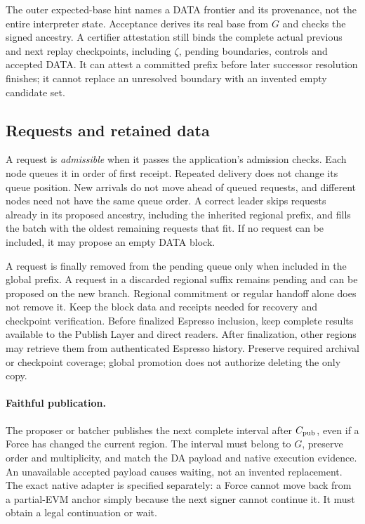\documentclass[11pt,a4paper]{article}
\newcommand{\defterm}[1]{\textcolor{rrBlue}{\textit{#1}}}
\begin{document}
The outer expected-base hint names a DATA frontier and its provenance,
not the entire interpreter state. Acceptance derives its real base from
$G$ and checks the signed ancestry. A certifier attestation still binds
the complete actual previous and next replay checkpoints, including
$\zeta$, pending boundaries, controls and accepted DATA. It can attest a
committed prefix before later successor resolution finishes; it cannot
replace an unresolved boundary with an invented empty candidate set.

\subsection{Requests and retained data}
\label{sec:requests}
A request is \defterm{admissible} when it passes the application's admission
checks. Each node queues it in order of first receipt. Repeated delivery
does not change its queue position. New arrivals do not move
ahead of queued requests, and different nodes need not have the same
queue order. A correct leader skips requests
already in its proposed ancestry, including the inherited regional
prefix, and fills the batch with the oldest remaining requests that fit.
If no request can be included, it may propose an empty DATA block.

A request is finally removed from the pending queue only when included
in the global prefix. A request in a discarded regional suffix remains
pending and can be proposed on the new branch. Regional commitment or
regular handoff alone does not remove it. Keep the block data and
receipts needed for recovery and checkpoint verification. Before finalized Espresso
inclusion, keep complete results available to the Publish Layer and
direct readers. After finalization, other regions may retrieve them from
authenticated Espresso history. Preserve required archival or checkpoint
coverage; global promotion does not authorize deleting the only copy.



\paragraph{Faithful publication.}
The proposer or batcher publishes the next complete interval after
$C_{\rm pub}$, even if a Force has changed the current region.
The interval must belong to $G$, preserve order and multiplicity, and
match the DA payload and native execution evidence. An unavailable
accepted payload causes waiting, not an invented replacement.
The exact native adapter is specified separately: a Force cannot move
back from a partial-EVM anchor simply because the next signer cannot
continue it. It must obtain a legal continuation or wait.
\end{document}
